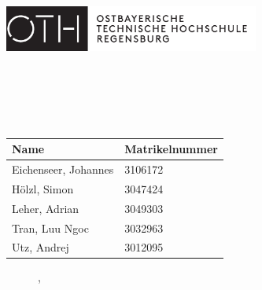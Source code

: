 \begin{titlepage}
	\includegraphics[height=1.5cm]{Logo/oth_logo_neu.eps}
	\vspace{1cm}
	\begin{center}       
        \spacedallcaps{\small{\myUni}} \\
        \spacedallcaps{\small{\myFaculty}} \\ \vspace*{2\baselineskip}
		\Large     
        \begingroup
        	\textbf{\mySubject} \\ \vspace*{\baselineskip}
        	\spacedallcaps{\textbf{\myTitle}} \\ \vspace*{2\baselineskip}
            \textbf{\mySubtitle}
        \endgroup
        \large
        \vspace*{10\baselineskip}
		\begin{table}[h]
			\centering
			\begin{tabularx}{0.5\textwidth}{|X|X|}
			\hline 
			\textbf{Name} & \textbf{Matrikelnummer} \\
			\hline 
			Eichenseer, Johannes & 3106172 \\ 
			\hline 
			Hölzl, Simon & 3047424 \\ 
			\hline 
			Leher, Adrian & 3049303 \\ 
			\hline 
			Tran, Luu Ngoc & 3032963 \\ 
			\hline 
			Utz, Andrej & 3012095 \\ 
			\hline
			\end{tabularx}
		\end{table}
    	\begin{figure}[b]
    		\begin{center}
		    	\myTime, \myLocation
	    	\end{center}
    	\end{figure}
    \end{center}
\end{titlepage}   